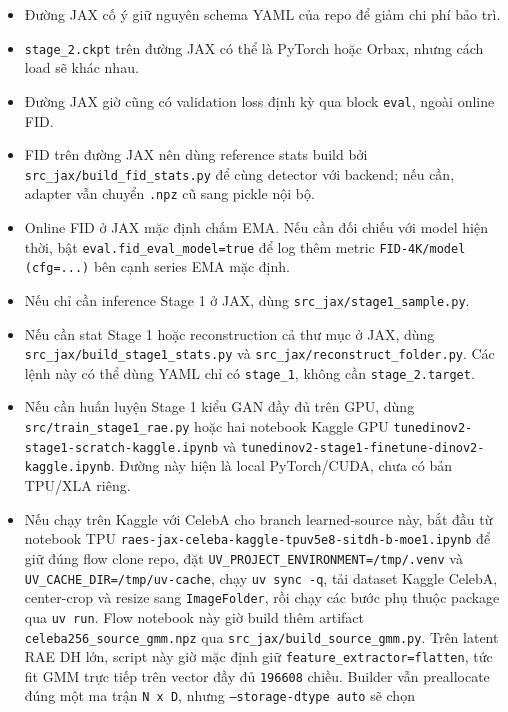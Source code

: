 \begin{itemize}[leftmargin=1.5em]
  \item Đường JAX cố ý giữ nguyên schema YAML của repo để giảm chi phí bảo trì.
  \item \texttt{stage\_2.ckpt} trên đường JAX có thể là PyTorch hoặc Orbax, nhưng
  cách load sẽ khác nhau.
  \item Đường JAX giờ cũng có validation loss định kỳ qua block \texttt{eval},
  ngoài online FID.
  \item FID trên đường JAX nên dùng reference stats build bởi
  \texttt{src\_jax/build\_fid\_stats.py} để cùng detector với backend; nếu cần,
  adapter vẫn chuyển \texttt{.npz} cũ sang pickle nội bộ.
  \item Online FID ở JAX mặc định chấm EMA. Nếu cần đối chiếu với model hiện
  thời, bật \texttt{eval.fid\_eval\_model=true} để log thêm metric
  \texttt{FID-4K/model (cfg=...)} bên cạnh series EMA mặc định.
  \item Nếu chỉ cần inference Stage 1 ở JAX, dùng \texttt{src\_jax/stage1\_sample.py}.
  \item Nếu cần stat Stage 1 hoặc reconstruction cả thư mục ở JAX, dùng
  \texttt{src\_jax/build\_stage1\_stats.py} và \texttt{src\_jax/reconstruct\_folder.py}.
  Các lệnh này có thể dùng YAML chỉ có \texttt{stage\_1}, không cần
  \texttt{stage\_2.target}.
  \item Nếu cần huấn luyện Stage 1 kiểu GAN đầy đủ trên GPU, dùng
  \texttt{src/train\_stage1\_rae.py} hoặc hai notebook Kaggle GPU
  \texttt{tunedinov2-stage1-scratch-kaggle.ipynb} và
  \texttt{tunedinov2-stage1-finetune-dinov2-kaggle.ipynb}. Đường này hiện là
  local PyTorch/CUDA, chưa có bản TPU/XLA riêng.
  \item Nếu chạy trên Kaggle với CelebA cho branch learned-source này, bắt đầu từ notebook TPU
  \texttt{raes-jax-celeba-kaggle-tpuv5e8-sitdh-b-moe1.ipynb} để giữ đúng flow clone repo, đặt
  \texttt{UV\_PROJECT\_ENVIRONMENT=/tmp/.venv} và
  \texttt{UV\_CACHE\_DIR=/tmp/uv-cache}, chạy \texttt{uv sync -q}, tải
  dataset Kaggle CelebA, center-crop và resize sang
  \texttt{ImageFolder}, rồi
  chạy các bước phụ thuộc package qua \texttt{uv run}. Flow notebook này giờ
  build thêm artifact \texttt{celeba256\_source\_gmm.npz} qua
  \texttt{src\_jax/build\_source\_gmm.py}. Trên latent RAE DH lớn, script này
  giờ mặc định giữ \texttt{feature\_extractor=flatten}, tức fit GMM trực tiếp
  trên vector đầy đủ \texttt{196608} chiều. Builder vẫn preallocate đúng một
  ma trận \texttt{N x D}, nhưng \texttt{--storage-dtype auto} sẽ chọn

\end{itemize}
